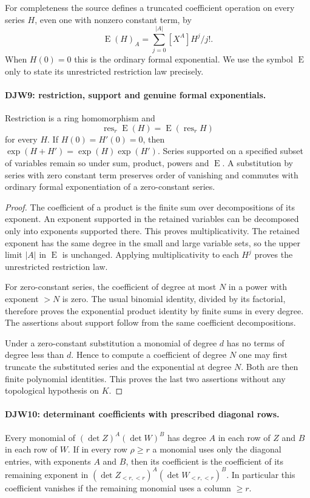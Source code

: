 \documentclass[11pt,a4paper]{article}
\numberwithin{equation}{section}
\theoremstyle{remark}\newtheorem{remark}[theorem]{Remark}
\begin{document}
For completeness the source defines a truncated coefficient operation
on every series $H$, even one with nonzero constant term, by
\[
 \operatorname{E}(H)_A
       =\sum_{j=0}^{|A|}[X^A]H^j/j!.
\]
When $H(0)=0$ this is the ordinary formal exponential.  We use
the symbol $\operatorname{E}$ only to state its unrestricted
restriction law precisely.

\paragraph{DJW9: restriction, support and genuine formal exponentials.}
\label{claim:DJW9}
Restriction is a ring homomorphism and
\[
 \operatorname{res}_r\operatorname{E}(H)
       =\operatorname{E}(\operatorname{res}_rH)
\]
for every $H$.  If $H(0)=H'(0)=0$, then
$\exp(H+H')=\exp(H)\exp(H')$.
Series supported on a specified subset of variables remain so under
sum, product, powers and $\operatorname{E}$.  A substitution by
series with zero constant term preserves order of vanishing and
commutes with ordinary formal exponentiation of a zero-constant
series.

\begin{proof}
The coefficient of a product is the finite sum over decompositions
of its exponent.  An exponent supported in the retained variables
can be decomposed only into exponents supported there.  This proves
multiplicativity.  The retained exponent has the same degree in
the small and large variable sets, so the upper limit $|A|$ in
$\operatorname{E}$ is unchanged.  Applying multiplicativity to
each $H^j$ proves the unrestricted restriction law.

For zero-constant series, the coefficient of degree at most $N$
in a power with exponent $>N$ is zero.  The usual binomial identity,
divided by its factorial, therefore proves the exponential product
identity by finite sums in every degree.  The assertions about
support follow from the same coefficient decompositions.

Under a zero-constant substitution a monomial of degree $d$ has
no terms of degree less than $d$.  Hence to compute a coefficient
of degree $N$ one may first truncate the substituted series and
the exponential at degree $N$.  Both are then finite polynomial
identities.  This proves the last two assertions without any
topological hypothesis on $K$.
\end{proof}

\paragraph{DJW10: determinant coefficients with prescribed diagonal rows.}
\label{claim:DJW10}
Every monomial of $(\det Z)^A(\det W)^B$ has degree $A$ in
each row of $Z$ and $B$ in each row of $W$.
If in every row $\rho\ge r$ a monomial uses only the diagonal
entries, with exponents $A$ and $B$, then its coefficient is the
coefficient of its remaining exponent in
$(\det Z_{<r,<r})^A(\det W_{<r,<r})^B$.
In particular this coefficient vanishes if the remaining monomial
uses a column $\ge r$.
\end{document}
